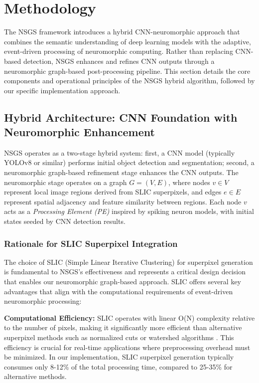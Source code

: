 \documentclass[conference]{IEEEtran}
\begin{document}
\section{Methodology} \label{sec:methodology}
The NSGS framework introduces a hybrid CNN-neuromorphic approach that combines the semantic understanding of deep learning models with the adaptive, event-driven processing of neuromorphic computing. Rather than replacing CNN-based detection, NSGS enhances and refines CNN outputs through a neuromorphic graph-based post-processing pipeline. This section details the core components and operational principles of the NSGS hybrid algorithm, followed by our specific implementation approach.

\subsection{Hybrid Architecture: CNN Foundation with Neuromorphic Enhancement}

NSGS operates as a two-stage hybrid system: first, a CNN model (typically YOLOv8 or similar) performs initial object detection and segmentation; second, a neuromorphic graph-based refinement stage enhances the CNN outputs. The neuromorphic stage operates on a graph \(G = (V, E)\), where nodes \(v \in V\) represent local image regions derived from SLIC superpixels, and edges \(e \in E\) represent spatial adjacency and feature similarity between regions. Each node \(v\) acts as a \textit{Processing Element (PE)} inspired by spiking neuron models, with initial states seeded by CNN detection results.

\subsubsection{Rationale for SLIC Superpixel Integration}

The choice of SLIC (Simple Linear Iterative Clustering) for superpixel generation is fundamental to NSGS's effectiveness and represents a critical design decision that enables our neuromorphic graph-based approach. SLIC offers several key advantages that align with the computational requirements of event-driven neuromorphic processing:

\textbf{Computational Efficiency:} SLIC operates with linear O(N) complexity relative to the number of pixels, making it significantly more efficient than alternative superpixel methods such as normalized cuts or watershed algorithms \cite{Achanta2012}. This efficiency is crucial for real-time applications where preprocessing overhead must be minimized. In our implementation, SLIC superpixel generation typically consumes only 8-12\% of the total processing time, compared to 25-35\% for alternative methods.
\end{document}

